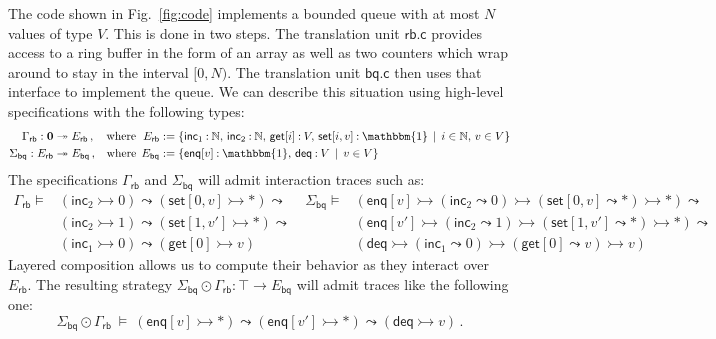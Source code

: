 \documentclass[acmsmall,screen,review,anonymous,nonacm]{acmart}
\newcommand{\kw}[1]{\ensuremath{ \mathsf{#1} }}
\newcommand{\emptysig}{\mathbf0}
\begin{document}
\begin{example} \label{ex:bq} %
The code shown in Fig.~\ref{fig:code}
implements a bounded queue
with at most $N$ values of type $V$.
This is done in two steps.
The translation unit $\kw{rb.c}$
provides access to a ring buffer
in the form of an array as well as
two counters which wrap around
to stay in the interval $[0, N)$.
The translation unit $\kw{bq.c}$ then uses that interface
to implement the queue.
We can describe this situation using
high-level specifications with the following types:
\begin{align*}
  \Gamma_\kw{rb} : \emptysig &\twoheadrightarrow E_\kw{rb} \,,
  & \text{where} \:\:\,
  E_\kw{rb} &:= \{
    \kw{inc}_1 \mathbin: \mathbb{N}, \,
    \kw{inc}_2 \mathbin: \mathbb{N}, \,
    \kw{get}[i] \mathbin: V, \,
    \kw{set}[i, v] \mathbin: \mathbbm{1} \, \mid \,
    i \in \mathbb{N}, \, v \in V
  \}
  \\
  \Sigma_\kw{bq} : E_\kw{rb} &\twoheadrightarrow E_\kw{bq} \,,
  & \text{where} \:\:
  E_\kw{bq} &:= \{
    \kw{enq}[v] \mathbin: \mathbbm{1}, \,
    \kw{deq} \mathbin: V \, \mid \,
    v \in V
  \}
\end{align*}
The specifications $\Gamma_\kw{rb}$ and $\Sigma_\kw{bq}$
will admit interaction traces such as:
{\small \begin{align*}
  \Gamma_\kw{rb} \vDash {} &
    (\kw{inc}_2 \rightarrowtail 0) \leadsto
    (\kw{set}[0, v] \rightarrowtail {*}) \leadsto &
  \:
  \Sigma_\kw{bq} \vDash {} &
    (\kw{enq}[v] \rightarrowtail
      (\kw{inc}_2 \leadsto 0) \rightarrowtail
      (\kw{set}[0, v] \leadsto {*}) \rightarrowtail
      {*}) \leadsto
  \\&
    (\kw{inc}_2 \rightarrowtail 1) \leadsto
    (\kw{set}[1, v'] \rightarrowtail {*}) \leadsto
  &&
    (\kw{enq}[v'] \rightarrowtail
      (\kw{inc}_2 \leadsto 1) \rightarrowtail
      (\kw{set}[1, v'] \leadsto {*}) \rightarrowtail
      {*}) \leadsto
  \\&
    (\kw{inc}_1 \rightarrowtail 0) \leadsto
    (\kw{get}[0] \rightarrowtail v)
  &&
    (\kw{deq} \rightarrowtail
      (\kw{inc}_1 \leadsto 0) \rightarrowtail
      (\kw{get}[0] \leadsto v) \rightarrowtail
      v)
\end{align*}}%
Layered composition allows us to compute their behavior
as they interact over $E_\kw{rb}$.
The resulting strategy
$\Sigma_\kw{bq} \odot \Gamma_\kw{rb} :
 \top \rightarrow E_\kw{bq}$
will admit traces like the following one:
\[
  \Sigma_\kw{bq} \odot \Gamma_\kw{rb} \: \vDash \:
    (\kw{enq}[v] \rightarrowtail {*}) \leadsto
    (\kw{enq}[v'] \rightarrowtail {*}) \leadsto
    (\kw{deq} \rightarrowtail v)
  \,.
\]
\end{example}
\end{document}
